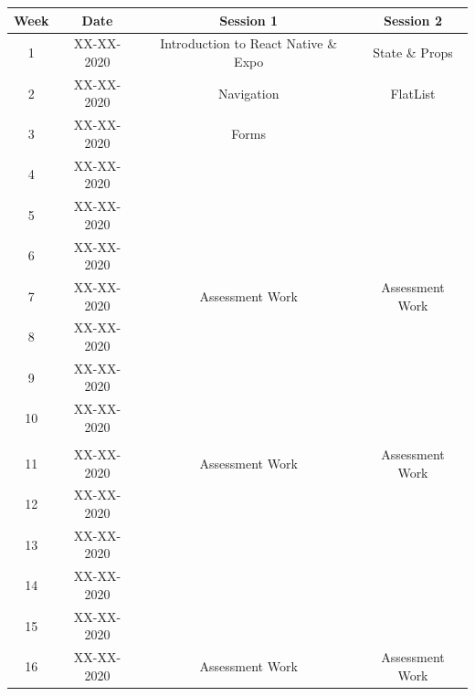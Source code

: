 \documentclass{article}
\begin{document}
\renewcommand{\arraystretch}{1.5}
\begin{tabular}{|c|c|c|c|}
  \hline
  \textbf{Week} & \textbf{Date} & \textbf{Session 1} & \textbf{Session 2} \\ \hline
  1             & XX-XX-2020    & Introduction to React Native \& Expo                   &   State \& Props                 \\ \hline
  2             & XX-XX-2020    &   Navigation                 &    FlatList                \\ \hline
  3             & XX-XX-2020    &    Forms                &                    \\ \hline
  4             & XX-XX-2020    &                    &                    \\ \hline
  5             & XX-XX-2020    &                    &                    \\ \hline
  6             & XX-XX-2020    &                    &                    \\ \hline
  7             & XX-XX-2020    &  Assessment Work                   &   Assessment Work                  \\ \hline
  8             & XX-XX-2020    &                    &                    \\ \hline
  9             & XX-XX-2020    &                    &                    \\ \hline
  10            & XX-XX-2020    &                    &                    \\ \hline
  \rowcolor{yellow} \multicolumn{4}{|c|}{Mid Term Break}                                                      \\ \hline
  11            & XX-XX-2020    &   Assessment Work                  &     Assessment Work                \\ \hline
  12            & XX-XX-2020    &                    &                    \\ \hline
  13            & XX-XX-2020    &                    &                    \\ \hline
  14            & XX-XX-2020    &                    &                    \\ \hline
  15            & XX-XX-2020    &                    &                    \\ \hline
  16            & XX-XX-2020    &  Assessment Work                  &   Assessment Work                  \\ \hline
\end{tabular}
\end{document}
